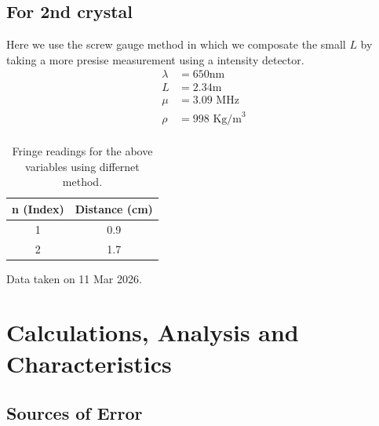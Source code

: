 \documentclass[%
sor,
 jor,
 amsmath,amssymb,
 reprint,
longbibliography,
]{revtex4-2}
\begin{document}
\subsection{For 2nd crystal}
Here we use the screw gauge method in which we composate the small $L$ by taking a more presise measurement using a intensity detector.
\begin{align*}
	\lambda &= 650\si{\nano\meter}\\
    L &= 2.34\si{\m}\\
    \mu &= 3.09 \text{ MHz}\\
    \rho &= 998 \text{ Kg/m}^3\\
\end{align*}
\begin{table}[H]
\centering
\begin{tabular}{|c|c|}
\hline
n (Index) & Distance (cm) \\
\hline
1 & 0.9 \\
2 & 1.7 \\
\hline
\end{tabular}
\caption{Fringe readings for the above variables using differnet method.}
\end{table}




\begin{center}
	Data taken on 11 Mar 2026.
\end{center}

\section{Calculations, Analysis and Characteristics}
\subsection{Sources of Error}
\end{document}
